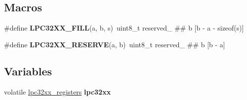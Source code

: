 \subsection*{Macros}
\begin{DoxyCompactItemize}
\item 
\mbox{\label{group__lpc32xx__reg_ga8a815b4978a9a482b005bc4c30e65756}} 
\#define {\bfseries L\+P\+C32\+X\+X\+\_\+\+F\+I\+LL}(a,  b,  s)~uint8\+\_\+t reserved\+\_\+ \#\# b \mbox{[}b -\/ a -\/ sizeof(s)\mbox{]}
\item 
\mbox{\label{group__lpc32xx__reg_ga5bb88edbc4086c8a00a30a6f981e76b2}} 
\#define {\bfseries L\+P\+C32\+X\+X\+\_\+\+R\+E\+S\+E\+R\+VE}(a,  b)~uint8\+\_\+t reserved\+\_\+ \#\# b \mbox{[}b -\/ a\mbox{]}
\end{DoxyCompactItemize}
\subsection*{Variables}
\begin{DoxyCompactItemize}
\item 
\mbox{\label{group__lpc32xx__reg_gadd1f46c6d223e08eaa2ef737cbb435f2}} 
volatile \mbox{\hyperlink{structlpc32xx__registers}{lpc32xx\+\_\+registers}} {\bfseries lpc32xx}
\end{DoxyCompactItemize}
